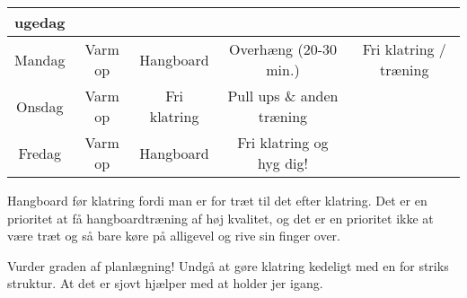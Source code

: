 
\begin{table}[h!]
  \centering
  \begin{tabular}{c| c c c c}
    \textbf{ugedag} & & \\ \hline
    Mandag & Varm op & Hangboard & Overh\ae ng (20-30 min.) & Fri klatring / tr\ae ning \\
    Onsdag & Varm op & Fri klatring & Pull ups \& anden tr\ae ning & \\
    Fredag & Varm op & Hangboard & Fri klatring og hyg dig! & \\
  \end{tabular}
\end{table}
  \vspace{1em}
 
Hangboard før klatring fordi man er for træt til det efter klatring. Det er en prioritet at få hangboardtræning af høj kvalitet, og det er en prioritet ikke at være træt og så bare køre på alligevel og rive sin finger over.

Vurder graden af planl\ae gning! Undg{\aa} at gøre klatring kedeligt med en for striks struktur.
At det er sjovt hj\ae lper med at holder jer igang.
